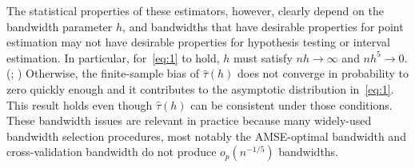 \documentclass[12pt,fleqn]{article}
\begin{document}
The statistical properties of these estimators, however, clearly depend on the
bandwidth parameter $h$, and bandwidths that have desirable properties for point
estimation may not have desirable properties for hypothesis testing or interval
estimation. In particular, for~\eqref{eq:1} to hold, $h$ must satisfy
$n h \to \infty$ and $n h^5 \to 0$. (\citealp{HTV2001}; \citealp{Porter03})
Otherwise, the finite-sample bias of $\hat\tau(h)$ does not converge in
probability to zero quickly enough and it contributes to the
asymptotic distribution in~\eqref{eq:1}. This result holds even though
$\hat\tau(h)$ can be consistent under those conditions.  These bandwidth issues
are relevant in practice because many widely-used bandwidth selection
procedures, most notably the AMSE-optimal bandwidth and cross-validation
bandwidth \citep{IK} do not produce $o_{p}(n^{-1/5})$ bandwidths.
\end{document}

